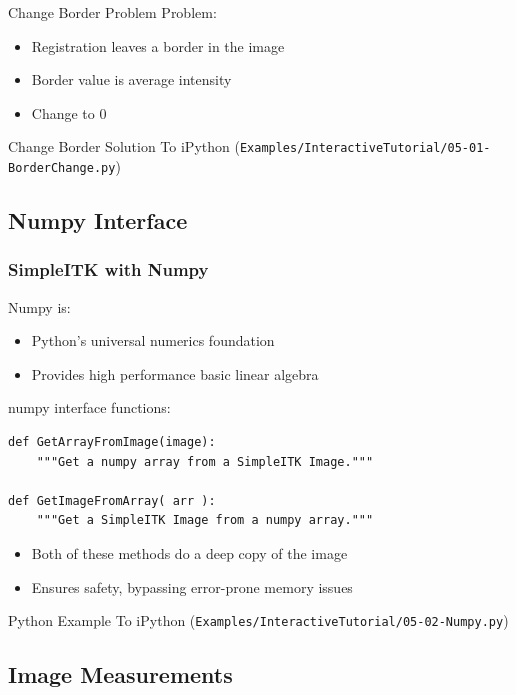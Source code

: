 \begin{frame}{Change Border Problem}
Problem:
\begin{itemize}
  \item Registration leaves a border in the image
  \item Border value is average intensity
  \item Change to 0
\end{itemize}
\end{frame}

\begin{frame}{Change Border Solution}
To iPython (\texttt{Examples/InteractiveTutorial/05-01-BorderChange.py})
\end{frame}

\subsection{Numpy Interface}
\begin{frame}[fragile]
\frametitle{SimpleITK with Numpy}

Numpy is:
\begin{itemize}
  \item Python's universal numerics foundation
  \item Provides high performance basic linear algebra
\end{itemize}

numpy interface functions:
\lstpython
\begin{lstlisting}
def GetArrayFromImage(image):
    """Get a numpy array from a SimpleITK Image."""

def GetImageFromArray( arr ):
    """Get a SimpleITK Image from a numpy array."""
\end{lstlisting}
\begin{itemize}
  \item Both of these methods do a deep copy of the image
  \item Ensures safety, bypassing error-prone memory issues
\end{itemize}

\end{frame}

\begin{frame}{Python Example}
To iPython (\texttt{Examples/InteractiveTutorial/05-02-Numpy.py})
\end{frame}

\subsection{Image Measurements}

